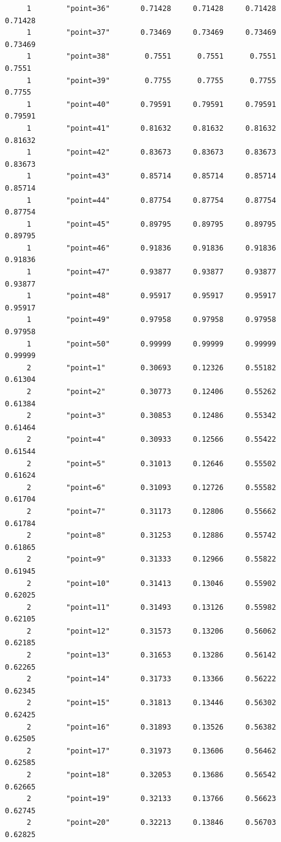 \documentclass[
]{book}
\begin{document}
\begin{verbatim}
     1        "point=36"       0.71428     0.71428     0.71428     0.71428
     1        "point=37"       0.73469     0.73469     0.73469     0.73469
     1        "point=38"        0.7551      0.7551      0.7551      0.7551
     1        "point=39"        0.7755      0.7755      0.7755      0.7755
     1        "point=40"       0.79591     0.79591     0.79591     0.79591
     1        "point=41"       0.81632     0.81632     0.81632     0.81632
     1        "point=42"       0.83673     0.83673     0.83673     0.83673
     1        "point=43"       0.85714     0.85714     0.85714     0.85714
     1        "point=44"       0.87754     0.87754     0.87754     0.87754
     1        "point=45"       0.89795     0.89795     0.89795     0.89795
     1        "point=46"       0.91836     0.91836     0.91836     0.91836
     1        "point=47"       0.93877     0.93877     0.93877     0.93877
     1        "point=48"       0.95917     0.95917     0.95917     0.95917
     1        "point=49"       0.97958     0.97958     0.97958     0.97958
     1        "point=50"       0.99999     0.99999     0.99999     0.99999
     2        "point=1"        0.30693     0.12326     0.55182     0.61304
     2        "point=2"        0.30773     0.12406     0.55262     0.61384
     2        "point=3"        0.30853     0.12486     0.55342     0.61464
     2        "point=4"        0.30933     0.12566     0.55422     0.61544
     2        "point=5"        0.31013     0.12646     0.55502     0.61624
     2        "point=6"        0.31093     0.12726     0.55582     0.61704
     2        "point=7"        0.31173     0.12806     0.55662     0.61784
     2        "point=8"        0.31253     0.12886     0.55742     0.61865
     2        "point=9"        0.31333     0.12966     0.55822     0.61945
     2        "point=10"       0.31413     0.13046     0.55902     0.62025
     2        "point=11"       0.31493     0.13126     0.55982     0.62105
     2        "point=12"       0.31573     0.13206     0.56062     0.62185
     2        "point=13"       0.31653     0.13286     0.56142     0.62265
     2        "point=14"       0.31733     0.13366     0.56222     0.62345
     2        "point=15"       0.31813     0.13446     0.56302     0.62425
     2        "point=16"       0.31893     0.13526     0.56382     0.62505
     2        "point=17"       0.31973     0.13606     0.56462     0.62585
     2        "point=18"       0.32053     0.13686     0.56542     0.62665
     2        "point=19"       0.32133     0.13766     0.56623     0.62745
     2        "point=20"       0.32213     0.13846     0.56703     0.62825

\end{verbatim}
\end{document}
